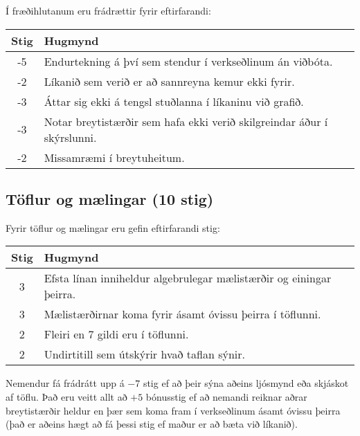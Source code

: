 \newpage

\begin{tcolorbox}

Í fræðihlutanum eru frádrættir fyrir eftirfarandi:

\begin{table}[H]
    \centering
    \begin{tabular}{|c|l|}
    \hline
       \textbf{Stig}  & \textbf{Hugmynd}   \\ \hline \hline
        -5  & Endurtekning á því sem stendur í verkseðlinum án viðbóta.  \\ \hline
        -2  & Líkanið sem verið er að sannreyna kemur ekki fyrir.
        \\\hline
        -3  & Áttar sig ekki á tengsl stuðlanna í líkaninu við grafið.
        \\\hline
        -3  & Notar breytistærðir sem hafa ekki verið skilgreindar áður í skýrslunni.
        \\\hline
        -2  & Missamræmi í breytuheitum.
        \\\hline
    \end{tabular}
\end{table}

\subsection*{Töflur og mælingar (10 stig)}

Fyrir töflur og mælingar eru gefin eftirfarandi stig:

\begin{table}[H]
    \centering
    \begin{tabular}{|c|l|}
    \hline
       \textbf{Stig}  & \textbf{Hugmynd}   \\ \hline \hline
        3  & Efsta línan inniheldur algebrulegar mælistærðir og einingar þeirra. \\ \hline
        3  & Mælistærðirnar koma fyrir ásamt óvissu þeirra í töflunni. \\ \hline
        2  & Fleiri en 7 gildi eru í töflunni. \\ \hline
        2  & Undirtitill sem útskýrir hvað taflan sýnir. \\ \hline
    \end{tabular}
\end{table}

Nemendur fá frádrátt upp á $-7$ stig ef að þeir sýna aðeins ljósmynd eða skjáskot af töflu. Það eru veitt allt að $+5$ bónusstig ef að nemandi reiknar aðrar breytistærðir heldur en þær sem koma fram í verkseðlinum ásamt óvissu þeirra (það er aðeins hægt að fá þessi stig ef maður er að bæta við líkanið).



\end{tcolorbox}
